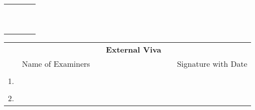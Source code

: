 \ifIDP
\begin{table}[H]
\centering
\begin{tabular}{p{}p{}p{}c}
	&&&\\
	&&&\\
	\centering{\printGuideNameA} & &\centering{\printHOD} &\\
	\centering{Guide} & & \centering{Head of the Department}& \\
	& & &\\
	& & & \\
	& & & \\
	\centering{\printDA} &  & \centering{\printPrincipal} &\\
	\centering{Dean Academics} & & \centering{Principal} &\\
	&&&\\
\end{tabular}%
\end{table}
\else
\begin{table}[H]
\centering
{}
\end{table}
\fi
\ifStuNameCUsed \vspace{-0.75cm}\fi
\begin{table}[H]
\centering
\begin{tabular}{lccp{6cm}cc}
	&&&\textbf{\Large External Viva}&&\\
	
	&Name of Examiners &&& & Signature with Date\\
	&&&&&\\
	1.&&&&&\\
	&&&&&\\
	2.&&&&&\\
\end{tabular}%
\end{table}
